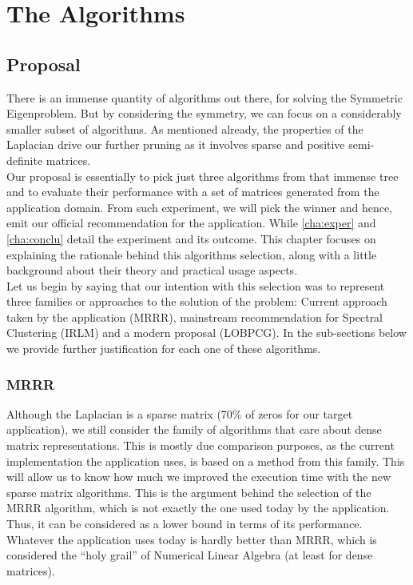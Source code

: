 \chapter{The Algorithms}
\label{cha:algs}

\section{Proposal}
\label{sec:propo}
There is an immense quantity of algorithms out there, for solving the
Symmetric Eigenproblem. But by considering the symmetry, we can focus
on a considerably smaller subset of algorithms. As mentioned already,
the properties of the Laplacian drive 
our further pruning as it involves sparse and positive semi-definite 
matrices. \\

Our proposal is essentially to pick just three algorithms from that
immense tree and to evaluate their performance with a set of matrices
generated from the application domain. From such experiment, we will
pick the winner and hence, emit our official recommendation for the
application. While \cref{cha:exper} and \cref{cha:conclu} detail the
experiment and its outcome. This chapter focuses on explaining the
rationale behind this algorithms selection, along with a little
background about their theory and practical usage aspects. \\

Let us begin by saying that our intention with this selection was to
represent three families or approaches to the solution of the problem:
Current approach taken by the application (\gls{MRRR}), mainstream
recommendation for Spectral Clustering (\gls{IRLM}) and a modern
 proposal (\gls{LOBPCG}). In the sub-sections below we provide
further justification for each one of these algorithms.

\subsection{\gls{MRRR}}
Although the \gls{Laplacian} is a sparse matrix (70\% of zeros for our
target application), we still consider the family of algorithms that
care about dense matrix representations. This is mostly due comparison
purposes, as the current implementation the application uses, is
based on a method from this family. This will allow us to know how
much we improved the execution time with the new sparse matrix
algorithms. This is the argument behind the selection of the
\gls{MRRR} algorithm, which is not exactly the one used today by the
application. Thus, it can be considered as a lower bound in terms of its
performance. Whatever the application uses today is hardly better than
\gls{MRRR}, which is considered the ``holy grail'' of Numerical Linear
Algebra \cite{hogben06} (at least for dense matrices).\\ 

